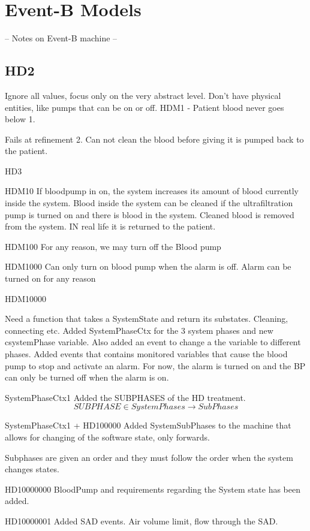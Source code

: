 \section{Event-B Models}
-- Notes on Event-B machine --

\subsection{HD2}
Ignore all values, focus only on the very abstract level. Don't have physical entities, like pumps that can be on or off.
HDM1 - Patient blood never goes below 1.


Fails at refinement 2. Can not clean the blood before giving it is pumped back to the patient.

HD3

HDM10
If bloodpump in on, the system increases its amount of blood currently inside the system.
Blood inside the system can be cleaned if the ultrafiltration pump is turned on and there is blood in the system.
Cleaned blood is removed from the system. IN real life it is returned to the patient. 

HDM100
For any reason, we may turn off the Blood pump

HDM1000
Can only turn on blood pump when the alarm is off.
Alarm can be turned on for any reason

HDM10000

Need a function that takes a SystemState and return its substates. Cleaning, connecting etc.
Added SystemPhaseCtx for the 3 system phases and new csystemPhase variable. Also added an event to change a the variable to different phases.
Added events that contains monitored variables that cause the blood pump to stop and activate an alarm. For now, the alarm is turned on and the BP can only be turned off when the alarm is on.


SystemPhaseCtx1
Added the SUBPHASES of the HD treatment. $$ SUBPHASE \in SystemPhases \longrightarrow SubPhases $$


SystemPhaseCtx1 + HD100000
Added SystemSubPhases to the machine that allows for changing of the software state, only forwards.

Subphases are given an order and they must follow the order when the system changes states.


HD10000000
BloodPump and requirements regarding the System state has been added. 


HD10000001
Added SAD events. Air volume limit, flow through the SAD. 


